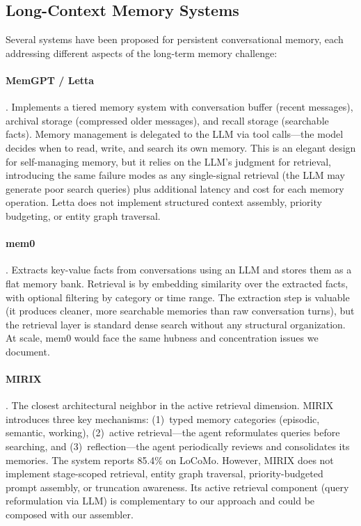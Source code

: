 \documentclass[11pt]{article}
\begin{document}
\subsection{Long-Context Memory Systems}
\label{sec:memory-systems}

Several systems have been proposed for persistent conversational
memory, each addressing different aspects of the long-term memory
challenge:

\paragraph{MemGPT / Letta} \citep{Packer2024}.
Implements a tiered memory system with conversation buffer (recent
messages), archival storage (compressed older messages), and recall
storage (searchable facts).  Memory management is delegated to the
LLM via tool calls---the model decides when to read, write, and
search its own memory.  This is an elegant design for self-managing
memory, but it relies on the LLM's judgment for retrieval,
introducing the same failure modes as any single-signal retrieval
(the LLM may generate poor search queries) plus additional latency
and cost for each memory operation.  Letta does not implement
structured context assembly, priority budgeting, or entity graph
traversal.

\paragraph{mem0} \citep{Chheda2024}.
Extracts key-value facts from conversations using an LLM and stores
them as a flat memory bank.  Retrieval is by embedding similarity
over the extracted facts, with optional filtering by category or time
range.  The extraction step is valuable (it produces cleaner, more
searchable memories than raw conversation turns), but the retrieval
layer is standard dense search without any structural organization.
At scale, mem0 would face the same hubness and concentration issues
we document.

\paragraph{MIRIX} \citep{Wang2025}.
The closest architectural neighbor in the active retrieval dimension.
MIRIX introduces three key mechanisms: (1)~typed memory categories
(episodic, semantic, working), (2)~active retrieval---the agent
reformulates queries before searching, and (3)~reflection---the
agent periodically reviews and consolidates its memories.  The
system reports 85.4\% on LoCoMo.  However, MIRIX does not implement
stage-scoped retrieval, entity graph traversal, priority-budgeted
prompt assembly, or truncation awareness.  Its active retrieval
component (query reformulation via LLM) is complementary to our
approach and could be composed with our assembler.
\end{document}
